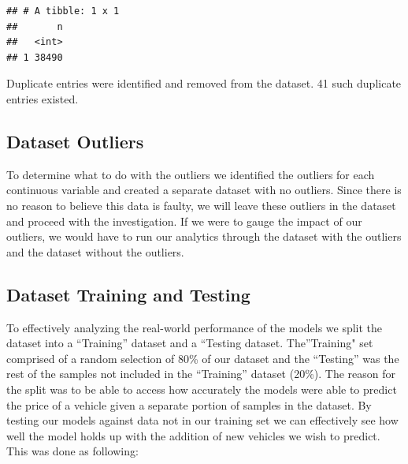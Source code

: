 \documentclass[
]{article}
\newenvironment{Shaded}{\begin{snugshade}}{\end{snugshade}}
\newcommand{\AttributeTok}[1]{\textcolor[rgb]{0.77,0.63,0.00}{#1}}
\newcommand{\ConstantTok}[1]{\textcolor[rgb]{0.00,0.00,0.00}{#1}}
\newcommand{\DecValTok}[1]{\textcolor[rgb]{0.00,0.00,0.81}{#1}}
\newcommand{\FloatTok}[1]{\textcolor[rgb]{0.00,0.00,0.81}{#1}}
\newcommand{\FunctionTok}[1]{\textcolor[rgb]{0.00,0.00,0.00}{#1}}
\newcommand{\NormalTok}[1]{#1}
\newcommand{\OtherTok}[1]{\textcolor[rgb]{0.56,0.35,0.01}{#1}}
\newcommand{\SpecialCharTok}[1]{\textcolor[rgb]{0.00,0.00,0.00}{#1}}
\begin{document}
\begin{verbatim}
## # A tibble: 1 x 1
##       n
##   <int>
## 1 38490
\end{verbatim}

Duplicate entries were identified and removed from the dataset. 41 such
duplicate entries existed.

\hypertarget{dataset-outliers}{%
\subsection{Dataset Outliers}\label{dataset-outliers}}

To determine what to do with the outliers we identified the outliers for
each continuous variable and created a separate dataset with no
outliers. Since there is no reason to believe this data is faulty, we
will leave these outliers in the dataset and proceed with the
investigation. If we were to gauge the impact of our outliers, we would
have to run our analytics through the dataset with the outliers and the
dataset without the outliers.

\hypertarget{dataset-training-and-testing}{%
\subsection{Dataset Training and
Testing}\label{dataset-training-and-testing}}

To effectively analyzing the real-world performance of the models we
split the dataset into a ``Training'' dataset and a ``Testing dataset.
The''Training" set comprised of a random selection of 80\% of our
dataset and the ``Testing'' was the rest of the samples not included in
the ``Training'' dataset (20\%). The reason for the split was to be able
to access how accurately the models were able to predict the price of a
vehicle given a separate portion of samples in the dataset. By testing
our models against data not in our training set we can effectively see
how well the model holds up with the addition of new vehicles we wish to
predict. This was done as following:

\begin{Shaded}
\end{Shaded}
\end{document}
